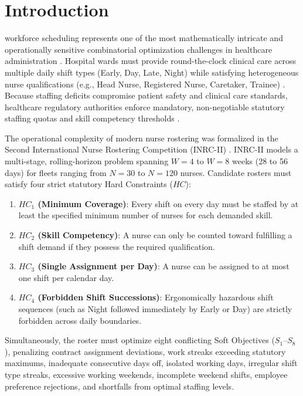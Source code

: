 \documentclass[10pt,journal,compsoc]{IEEEtran}
\begin{document}
\maketitle
\IEEEdisplaynontitleabstractindextext
\IEEEpeerreviewmaketitle

\section{Introduction}
 workforce scheduling represents one of the most mathematically intricate and operationally sensitive combinatorial optimization challenges in healthcare administration \cite{burke2004state,smet2014nurse}. Hospital wards must provide round-the-clock clinical care across multiple daily shift types (Early, Day, Late, Night) while satisfying heterogeneous nurse qualifications (e.g., Head Nurse, Registered Nurse, Caretaker, Trainee) \cite{ceschia2019second}. Because staffing deficits compromise patient safety and clinical care standards, healthcare regulatory authorities enforce mandatory, non-negotiable statutory staffing quotas and skill competency thresholds \cite{haspeslagh2014first}.

The operational complexity of modern nurse rostering was formalized in the Second International Nurse Rostering Competition (INRC-II) \cite{ceschia2019second}. INRC-II models a multi-stage, rolling-horizon problem spanning $W = 4$ to $W = 8$ weeks (28 to 56 days) for fleets ranging from $N = 30$ to $N = 120$ nurses. Candidate rosters must satisfy four strict statutory Hard Constraints ($HC$):
\begin{enumerate}
    \item \textbf{$HC_1$ (Minimum Coverage)}: Every shift on every day must be staffed by at least the specified minimum number of nurses for each demanded skill.
    \item \textbf{$HC_2$ (Skill Competency)}: A nurse can only be counted toward fulfilling a shift demand if they possess the required qualification.
    \item \textbf{$HC_3$ (Single Assignment per Day)}: A nurse can be assigned to at most one shift per calendar day.
    \item \textbf{$HC_4$ (Forbidden Shift Successions)}: Ergonomically hazardous shift sequences (such as Night followed immediately by Early or Day) are strictly forbidden across daily boundaries.
\end{enumerate}

Simultaneously, the roster must optimize eight conflicting Soft Objectives ($S_1$--$S_8$), penalizing contract assignment deviations, work streaks exceeding statutory maximums, inadequate consecutive days off, isolated working days, irregular shift type streaks, excessive working weekends, incomplete weekend shifts, employee preference rejections, and shortfalls from optimal staffing levels.
\end{document}
